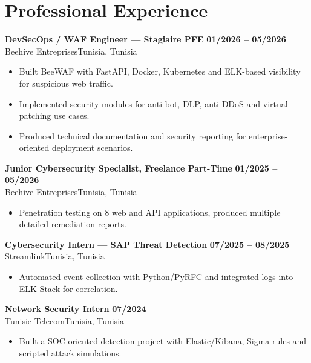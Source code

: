 \documentclass[a4paper,10pt]{article}
\newcommand{\cventry}[4]{\textbf{#1} \hfill \textbf{#4}\\[1pt]#2{\ifx\relax#3\relax\else, #3\fi}\par\vspace{2pt}}
\begin{document}
\section{Professional Experience}
\cventry{DevSecOps / WAF Engineer --- Stagiaire PFE}{Beehive Entreprises}{Tunisia}{01/2026 -- 05/2026}
\begin{itemize}
  \item Built BeeWAF with FastAPI, Docker, Kubernetes and ELK-based visibility for suspicious web traffic.
  \item Implemented security modules for anti-bot, DLP, anti-DDoS and virtual patching use cases.
  \item Produced technical documentation and security reporting for enterprise-oriented deployment scenarios.
\end{itemize}
\cventry{Junior Cybersecurity Specialist, Freelance Part-Time}{Beehive Entreprises}{Tunisia}{01/2025 -- 05/2026}
\begin{itemize}
  \item Penetration testing on 8 web and API applications, produced multiple detailed remediation reports.
\end{itemize}
\cventry{Cybersecurity Intern — SAP Threat Detection}{Streamlink}{Tunisia}{07/2025 -- 08/2025}
\begin{itemize}
  \item Automated event collection with Python/PyRFC and integrated logs into ELK Stack for correlation.
\end{itemize}
\cventry{Network Security Intern}{Tunisie Telecom}{Tunisia}{07/2024}
\begin{itemize}
  \item Built a SOC-oriented detection project with Elastic/Kibana, Sigma rules and scripted attack simulations.
\end{itemize}
\end{document}
